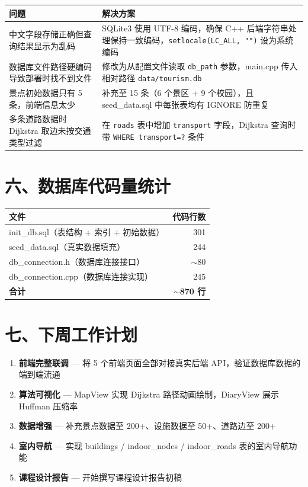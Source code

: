 \documentclass[12pt,a4paper]{article}
\begin{document}
\begin{center}
\begin{tabular}{p{4.5cm} p{7cm}}
    \toprule
    \bfseries 问题 & \bfseries 解决方案 \\
    \midrule
    中文字段存储正确但查询结果显示为乱码 & SQLite3 使用 UTF-8 编码，确保 C++ 后端字符串处理保持一致编码，\texttt{setlocale(LC\_ALL, "")} 设为系统编码 \\
    数据库文件路径硬编码导致部署时找不到文件 & 修改为从配置文件读取 \texttt{db\_path} 参数，main.cpp 传入相对路径 \texttt{data/tourism.db} \\
    景点初始数据只有 5 条，前端信息太少 & 补充至 15 条（6 个景区 + 9 个校园），且 seed\_data.sql 中每张表均有 IGNORE 防重复 \\
    多条道路数据时 Dijkstra 取边未按交通类型过滤 & 在 \texttt{roads} 表中增加 \texttt{transport} 字段，Dijkstra 查询时带 \texttt{WHERE transport=?} 条件 \\
    \bottomrule
\end{tabular}
\end{center}

\section*{六、数据库代码量统计}

\begin{center}
\begin{tabular}{l r}
    \toprule
    \bfseries 文件 & \bfseries 代码行数 \\
    \midrule
    init\_db.sql（表结构 + 索引 + 初始数据） & 301 \\
    seed\_data.sql（真实数据填充） & 244 \\
    db\_connection.h（数据库连接接口） & $\sim$80 \\
    db\_connection.cpp（数据库连接实现） & 245 \\
    \midrule
    \textbf{合计} & \textbf{$\sim$870 行} \\
    \bottomrule
\end{tabular}
\end{center}

\section*{七、下周工作计划}

\begin{enumerate}[leftmargin=2em]
    \item \textbf{前端完整联调} — 将 5 个前端页面全部对接真实后端 API，验证数据库数据的端到端流通
    \item \textbf{算法可视化} — MapView 实现 Dijkstra 路径动画绘制，DiaryView 展示 Huffman 压缩率
    \item \textbf{数据增强} — 补充景点数据至 200+、设施数据至 50+、道路边至 200+
    \item \textbf{室内导航} — 实现 buildings / indoor\_nodes / indoor\_roads 表的室内导航功能
    \item \textbf{课程设计报告} — 开始撰写课程设计报告初稿
\end{enumerate}
\end{document}
